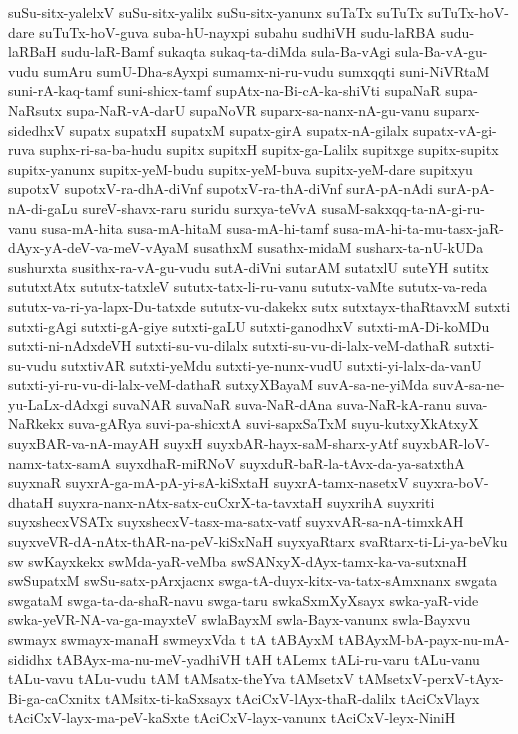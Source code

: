 {suSu-sitx-yalelxV
suSu-sitx-yalilx
suSu-sitx-yanunx
suTaTx
suTuTx
suTuTx-hoV-dare
suTuTx-hoV-guva
suba-hU-nayxpi
subahu
sudhiVH
sudu-laRBA
sudu-laRBaH
sudu-laR-Bamf
sukaqta
sukaq-ta-diMda
sula-Ba-vAgi
sula-Ba-vA-gu-vudu
sumAru
sumU-Dha-sAyxpi
sumamx-ni-ru-vudu
sumxqqti
suni-NiVRtaM
suni-rA-kaq-tamf
suni-shicx-tamf
supAtx-na-Bi-cA-ka-shiVti
supaNaR
supa-NaRsutx
supa-NaR-vA-darU
supaNoVR
suparx-sa-nanx-nA-gu-vanu
suparx-sidedhxV
supatx
supatxH
supatxM
supatx-girA
supatx-nA-gilalx
supatx-vA-gi-ruva
suphx-ri-sa-ba-hudu
supitx
supitxH
supitx-ga-Lalilx
supitxge
supitx-supitx
supitx-yanunx
supitx-yeM-budu
supitx-yeM-buva
supitx-yeM-dare
supitxyu
supotxV
supotxV-ra-dhA-diVnf
supotxV-ra-thA-diVnf
surA-pA-nAdi
surA-pA-nA-di-gaLu
sureV-shavx-raru
suridu
surxya-teVvA
susaM-sakxqq-ta-nA-gi-ru-vanu
susa-mA-hita
susa-mA-hitaM
susa-mA-hi-tamf
susa-mA-hi-ta-mu-tasx-jaR-dAyx-yA-deV-va-meV-vAyaM
susathxM
susathx-midaM
susharx-ta-nU-kUDa
sushurxta
susithx-ra-vA-gu-vudu
sutA-diVni
sutarAM
sutatxlU
suteYH
sutitx
sututxtAtx
sututx-tatxleV
sututx-tatx-li-ru-vanu
sututx-vaMte
sututx-va-reda
sututx-va-ri-ya-lapx-Du-tatxde
sututx-vu-dakekx
sutx
sutxtayx-thaRtavxM
sutxti
sutxti-gAgi
sutxti-gA-giye
sutxti-gaLU
sutxti-ganodhxV
sutxti-mA-Di-koMDu
sutxti-ni-nAdxdeVH
sutxti-su-vu-dilalx
sutxti-su-vu-di-lalx-veM-dathaR
sutxti-su-vudu
sutxtivAR
sutxti-yeMdu
sutxti-ye-nunx-vudU
sutxti-yi-lalx-da-vanU
sutxti-yi-ru-vu-di-lalx-veM-dathaR
sutxyXBayaM
suvA-sa-ne-yiMda
suvA-sa-ne-yu-LaLx-dAdxgi
suvaNAR
suvaNaR
suva-NaR-dAna
suva-NaR-kA-ranu
suva-NaRkekx
suva-gARya
suvi-pa-shicxtA
suvi-sapxSaTxM
suyu-kutxyXkAtxyX
suyxBAR-va-nA-mayAH
suyxH
suyxbAR-hayx-saM-sharx-yAtf
suyxbAR-loV-namx-tatx-samA
suyxdhaR-miRNoV
suyxduR-baR-la-tAvx-da-ya-satxthA
suyxnaR
suyxrA-ga-mA-pA-yi-sA-kiSxtaH
suyxrA-tamx-nasetxV
suyxra-boV-dhataH
suyxra-nanx-nAtx-satx-cuCxrX-ta-tavxtaH
suyxrihA
suyxriti
suyxshecxVSATx
suyxshecxV-tasx-ma-satx-vatf
suyxvAR-sa-nA-timxkAH
suyxveVR-dA-nAtx-thAR-na-peV-kiSxNaH
suyxyaRtarx
svaRtarx-ti-Li-ya-beVku
sw
swKayxkekx
swMda-yaR-veMba
swSANxyX-dAyx-tamx-ka-va-sutxnaH
swSupatxM
swSu-satx-pArxjacnx
swga-tA-duyx-kitx-va-tatx-sAmxnanx
swgata
swgataM
swga-ta-da-shaR-navu
swga-taru
swkaSxmXyXsayx
swka-yaR-vide
swka-yeVR-NA-va-ga-mayxteV
swlaBayxM
swla-Bayx-vanunx
swla-Bayxvu
swmayx
swmayx-manaH
swmeyxVda
t
tA
tABAyxM
tABAyxM-bA-payx-nu-mA-sididhx
tABAyx-ma-nu-meV-yadhiVH
tAH
tALemx
tALi-ru-varu
tALu-vanu
tALu-vavu
tALu-vudu
tAM
tAMsatx-theYva
tAMsetxV
tAMsetxV-perxV-tAyx-Bi-ga-caCxnitx
tAMsitx-ti-kaSxsayx
tAciCxV-lAyx-thaR-dalilx
tAciCxVlayx
tAciCxV-layx-ma-peV-kaSxte
tAciCxV-layx-vanunx
tAciCxV-leyx-NiniH
}

